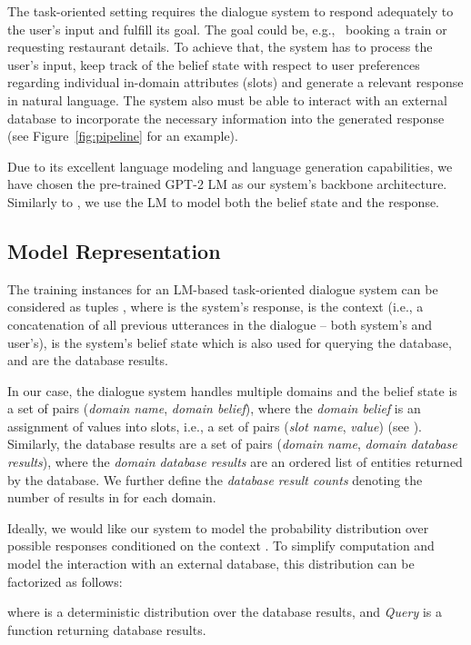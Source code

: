 \documentclass[11pt,a4paper]{article}
\begin{document}
The task-oriented setting requires the dialogue system to respond adequately to the user's input and fulfill its goal. The goal could be, e.g., \ booking a train or requesting restaurant details. To achieve that, the system has to process the user's input, keep track of the belief state with respect to user preferences regarding individual in-domain attributes (slots) and generate a relevant response in natural language. The system also must be able to interact with an external database to incorporate the necessary information into the generated response (see Figure~\ref{fig:pipeline} for an example).

Due to its excellent language modeling and language generation capabilities, we have chosen the pre-trained GPT-2 LM as our system's backbone architecture. Similarly to \citet{budzianowski2019}, we use the LM to model both the belief state and the response.

\subsection{Model Representation}
\label{sec:model-repres}

The training instances for an LM-based task-oriented dialogue system can be considered as tuples , where  is the system's response,  is the context (i.e., a concatenation of all previous utterances in the dialogue – both system's and user's),  is the system's belief state which is also used for querying the database, and  are the database results. 

In our case, the dialogue system handles multiple domains and the belief state is a set of pairs (\emph{domain name}, \emph{domain belief}), where the \emph{domain belief} is an assignment of values into slots, i.e., a set of pairs (\textit{slot name}, \textit{value}) (see ). Similarly, the database results  are a set of pairs (\textit{domain name}, \textit{domain database results}), where the \textit{domain database results} are an ordered list of entities returned by the database. We further define the \emph{database result counts}  denoting the number of results in  for each domain.

Ideally, we would like our system to model the probability distribution over possible responses conditioned on the context . To simplify computation and model the interaction with an external database, this distribution can be factorized as follows:

where  is a deterministic distribution over the database results, and \textit{Query} is a function returning database results.
\end{document}
